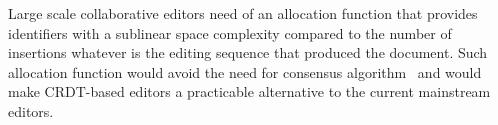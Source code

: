 \noindent Large scale collaborative editors need of an allocation function that
provides identifiers with a sublinear space complexity compared to the number of
insertions whatever is the editing sequence that produced the document. Such
allocation function would avoid the need for consensus
algorithm~\cite{mostefaoui2015signature} and would make CRDT-based editors a
practicable alternative to the current mainstream editors.

 
